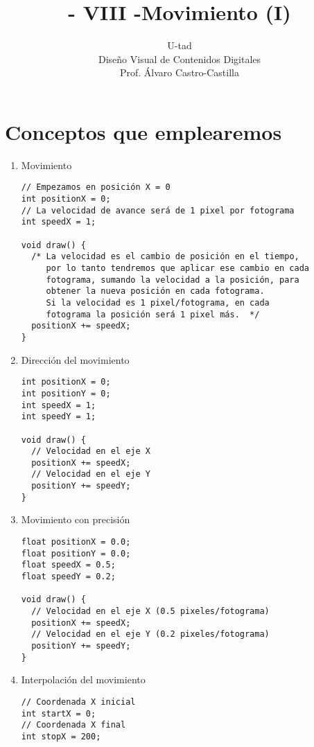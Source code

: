 \documentclass[a4paper,oneside]{article}
\title{- VIII -\linebreak Movimiento (I)}
\author{U-tad\\ Diseño Visual de Contenidos Digitales\\ Prof. Álvaro Castro-Castilla}
\date{}
\begin{document}
\maketitle


\section{Conceptos que emplearemos}
\begin{enumerate}
  \item Movimiento

    \begin{verbatim}
// Empezamos en posición X = 0
int positionX = 0;
// La velocidad de avance será de 1 pixel por fotograma
int speedX = 1;

void draw() {
  /* La velocidad es el cambio de posición en el tiempo,
     por lo tanto tendremos que aplicar ese cambio en cada
     fotograma, sumando la velocidad a la posición, para
     obtener la nueva posición en cada fotograma.
     Si la velocidad es 1 pixel/fotograma, en cada
     fotograma la posición será 1 pixel más.  */
  positionX += speedX;
}
    \end{verbatim}

  \item Dirección del movimiento

    \begin{verbatim}
int positionX = 0;
int positionY = 0;
int speedX = 1;
int speedY = 1;

void draw() {
  // Velocidad en el eje X
  positionX += speedX;
  // Velocidad en el eje Y
  positionY += speedY;
}
    \end{verbatim}

\newpage
  \item Movimiento con precisión

    \begin{verbatim}
float positionX = 0.0;
float positionY = 0.0;
float speedX = 0.5;
float speedY = 0.2;

void draw() {
  // Velocidad en el eje X (0.5 pixeles/fotograma)
  positionX += speedX;
  // Velocidad en el eje Y (0.2 pixeles/fotograma)
  positionY += speedY;
}
    \end{verbatim}

  \item Interpolación del movimiento

    \begin{verbatim}
// Coordenada X inicial
int startX = 0;
// Coordenada X final
int stopX = 200;


\end{verbatim}
\end{enumerate}
\end{document}
